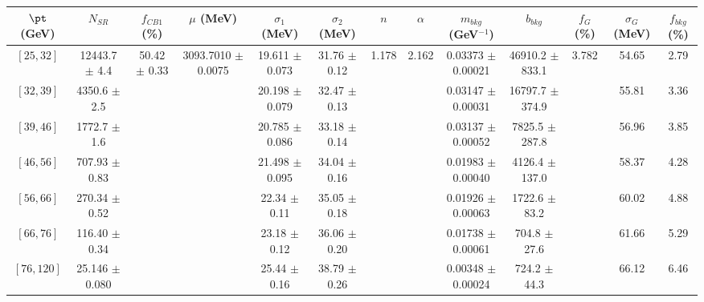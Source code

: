 \begin{tabular}{c||c|c|c|c|c|c|c|c|c|c|c||c}
$\pt$ (GeV) & $N_{SR}$ & $f_{CB1}$ (\%) & $\mu$ (MeV) & $\sigma_1$ (MeV) & $\sigma_2$ (MeV) & $n$ & $\alpha$ & $m_{bkg}$ (GeV$^{-1}$) & $b_{bkg}$ & $f_G$ (\%) & $\sigma_G$ (MeV) & $f_{bkg}$ (\%) \\
\hline
$[25, 32]$ & 12443.7 $\pm$ 4.4 & \multirow{7}{*}{50.42 $\pm$ 0.33} & \multirow{7}{*}{3093.7010 $\pm$ 0.0075} & 19.611 $\pm$ 0.073 & 31.76 $\pm$ 0.12 & \multirow{7}{*}{1.178} & \multirow{7}{*}{2.162} & 0.03373 $\pm$ 0.00021 & 46910.2 $\pm$ 833.1 & \multirow{7}{*}{3.782} & 54.65 & 2.79\\
$[32, 39]$ & 4350.6 $\pm$ 2.5 &  &  & 20.198 $\pm$ 0.079 & 32.47 $\pm$ 0.13 &  &  & 0.03147 $\pm$ 0.00031 & 16797.7 $\pm$ 374.9 &  & 55.81 & 3.36\\
$[39, 46]$ & 1772.7 $\pm$ 1.6 &  &  & 20.785 $\pm$ 0.086 & 33.18 $\pm$ 0.14 &  &  & 0.03137 $\pm$ 0.00052 & 7825.5 $\pm$ 287.8 &  & 56.96 & 3.85\\
$[46, 56]$ & 707.93 $\pm$ 0.83 &  &  & 21.498 $\pm$ 0.095 & 34.04 $\pm$ 0.16 &  &  & 0.01983 $\pm$ 0.00040 & 4126.4 $\pm$ 137.0 &  & 58.37 & 4.28\\
$[56, 66]$ & 270.34 $\pm$ 0.52 &  &  & 22.34 $\pm$ 0.11 & 35.05 $\pm$ 0.18 &  &  & 0.01926 $\pm$ 0.00063 & 1722.6 $\pm$ 83.2 &  & 60.02 & 4.88\\
$[66, 76]$ & 116.40 $\pm$ 0.34 &  &  & 23.18 $\pm$ 0.12 & 36.06 $\pm$ 0.20 &  &  & 0.01738 $\pm$ 0.00061 & 704.8 $\pm$ 27.6 &  & 61.66 & 5.29\\
$[76, 120]$ & 25.146 $\pm$ 0.080 &  &  & 25.44 $\pm$ 0.16 & 38.79 $\pm$ 0.26 &  &  & 0.00348 $\pm$ 0.00024 & 724.2 $\pm$ 44.3 &  & 66.12 & 6.46\\
\end{tabular}
